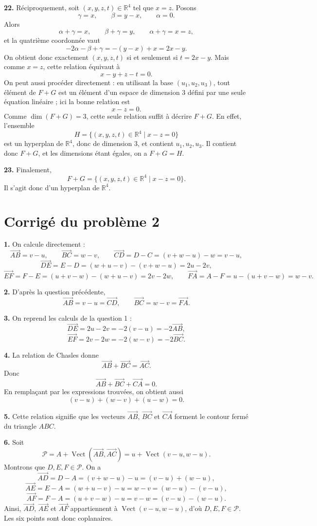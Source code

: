\documentclass[11pt,a4paper]{article}
\newcommand{\R}{\mathbb{R}}
\newcommand{\Vect}{\operatorname{Vect}}
\newcommand{\dimv}{\operatorname{dim}}
\newcommand{\p}[1]{\medskip\noindent\textbf{#1.}}
\begin{document}
\p{22} Réciproquement, soit $(x,y,z,t)\in\R^4$ tel que $x=z$.
Posons
\[
\gamma=x,
\qquad \beta=y-x,
\qquad \alpha=0.
\]
Alors
\[
\alpha+\gamma=x,
\qquad \beta+\gamma=y,
\qquad \alpha+\gamma=x=z,
\]
et la quatrième coordonnée vaut
\[
-2\alpha-\beta+\gamma=-(y-x)+x=2x-y.
\]
On obtient donc exactement $(x,y,z,t)$ si et seulement si $t=2x-y$.
Mais comme $x=z$, cette relation équivaut à
\[
x-y+z-t=0.
\]
On peut aussi procéder directement : en utilisant la base $(u_1,u_2,u_3)$, tout élément de $F+G$ est un élément d'un espace de dimension $3$ défini par une seule équation linéaire ; ici la bonne relation est
\[
x-z=0.
\]
Comme $\dimv(F+G)=3$, cette seule relation suffit à décrire $F+G$.
En effet, l'ensemble
\[
H=\{(x,y,z,t)\in\R^4\mid x-z=0\}
\]
est un hyperplan de $\R^4$, donc de dimension $3$, et contient $u_1,u_2,u_3$. Il contient donc $F+G$, et les dimensions étant égales, on a $F+G=H$.

\p{23} Finalement,
\[
F+G=\{(x,y,z,t)\in\R^4\mid x-z=0\}.
\]
Il s'agit donc d'un hyperplan de $\R^4$.

\section*{Corrigé du problème 2}

\p{1} On calcule directement :
\[
\overrightarrow{AB}=v-u,
\qquad
\overrightarrow{BC}=w-v,
\qquad
\overrightarrow{CD}=D-C=(v+w-u)-w=v-u,
\]
\[
\overrightarrow{DE}=E-D=(w+u-v)-(v+w-u)=2u-2v,
\]
\[
\overrightarrow{EF}=F-E=(u+v-w)-(w+u-v)=2v-2w,
\qquad
\overrightarrow{FA}=A-F=u-(u+v-w)=w-v.
\]

\p{2} D'après la question précédente,
\[
\overrightarrow{AB}=v-u=\overrightarrow{CD},
\qquad
\overrightarrow{BC}=w-v=\overrightarrow{FA}.
\]

\p{3} On reprend les calculs de la question 1 :
\[
\overrightarrow{DE}=2u-2v=-2(v-u)=-2\overrightarrow{AB},
\]
\[
\overrightarrow{EF}=2v-2w=-2(w-v)=-2\overrightarrow{BC}.
\]

\p{4} La relation de Chasles donne
\[
\overrightarrow{AB}+\overrightarrow{BC}=\overrightarrow{AC}.
\]
Donc
\[
\overrightarrow{AB}+\overrightarrow{BC}+\overrightarrow{CA}=0.
\]
En remplaçant par les expressions trouvées, on obtient aussi
\[
(v-u)+(w-v)+(u-w)=0.
\]

\p{5} Cette relation signifie que les vecteurs $\overrightarrow{AB}$, $\overrightarrow{BC}$ et $\overrightarrow{CA}$ forment le contour fermé du triangle $ABC$.

\p{6} Soit
\[
\mathcal P=A+\Vect(\overrightarrow{AB},\overrightarrow{AC})=u+\Vect(v-u,w-u).
\]
Montrons que $D,E,F\in\mathcal P$.
On a
\[
\overrightarrow{AD}=D-A=(v+w-u)-u=(v-u)+(w-u),
\]
\[
\overrightarrow{AE}=E-A=(w+u-v)-u=w-v=(w-u)-(v-u),
\]
\[
\overrightarrow{AF}=F-A=(u+v-w)-u=v-w=(v-u)-(w-u).
\]
Ainsi, $\overrightarrow{AD}$, $\overrightarrow{AE}$ et $\overrightarrow{AF}$ appartiennent à $\Vect(v-u,w-u)$, d'où $D,E,F\in\mathcal P$.
Les six points sont donc coplanaires.
\end{document}

